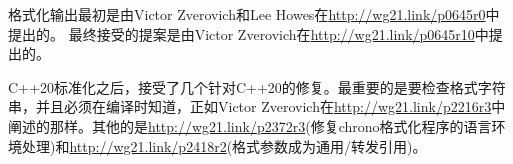 格式化输出最初是由Victor Zverovich和Lee Howes在\url{http://wg21.link/p0645r0}中提出的。
最终接受的提案是由Victor Zverovich在\url{http://wg21.link/p0645r10}中提出的。

C++20标准化之后，接受了几个针对C++20的修复。最重要的是要检查格式字符串，并且必须在编译时知道，正如Victor Zverovich在\url{http://wg21.link/p2216r3}中阐述的那样。其他的是\url{http://wg21.link/p2372r3}(修复chrono格式化程序的语言环境处理)和\url{http://wg21.link/p2418r2}(格式参数成为通用/转发引用)。